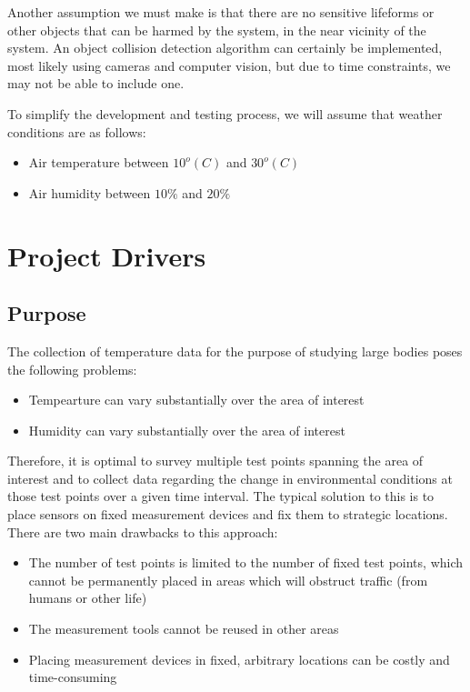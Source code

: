 \documentclass[11pt]{article}
\begin{document}
Another assumption we must make is that there are no sensitive lifeforms or other objects that can be harmed by the system, in the near vicinity of the system. An object collision detection algorithm can certainly be implemented, most likely using cameras and computer vision, but due to time constraints, we may not be able to include one.

To simplify the development and testing process, we will assume that weather conditions are as follows:

\begin{itemize}
    \item Air temperature between $10^o (C)$ and $30^o (C)$
    \item Air humidity between $10\%$ and $20\%$
\end{itemize}

\section{Project Drivers}
\subsection{Purpose}
The collection of temperature data for the purpose of studying large bodies poses the following problems: 
\begin{itemize}
    \item Tempearture can vary substantially over the area of interest
    \item Humidity can vary substantially over the area of interest
\end{itemize}

Therefore, it is optimal to survey multiple test points spanning the area of interest and to collect data regarding the change in environmental conditions at those test points over a given time interval. The typical solution to this is to place sensors on fixed measurement devices and fix them to strategic locations. There are two main drawbacks to this approach:
\begin{itemize}
    \item The number of test points is limited to the number of fixed test points, which cannot be permanently placed in areas which will obstruct traffic (from humans or other life)
    \item The measurement tools cannot be reused in other areas
    \item Placing measurement devices in fixed, arbitrary locations can be costly and time-consuming
\end{itemize}
\end{document}
